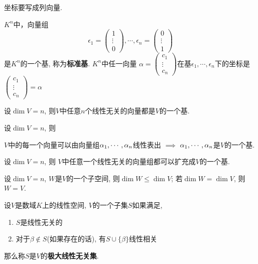 \begin{Remark}
坐标要写成列向量.
\end{Remark}

\begin{Example}
$K^n$中，向量组
$$
\epsilon_1 = \begin{pmatrix} 1 \\ \vdots \\ 0 \end{pmatrix},
\cdots,
\epsilon_n = \begin{pmatrix} 0 \\ \vdots \\ 1 \end{pmatrix}
$$
是$K^n$的一个基, 称为\textbf{标准基}.
 $K^n$中任一向量 $\displaystyle \alpha = \begin{pmatrix} c_1 \\ \vdots \\ c_n \end{pmatrix} $在基$\epsilon_1, \cdots, \epsilon_n$下的坐标是
$
\begin{pmatrix} c_1 \\ \vdots \\ c_n
\end{pmatrix} = \alpha
$
\end{Example}

\begin{Proposition}[!!]
设$\dim V = n$, 则$V$中任意$n$个线性无关的向量都是$V$的一个基.
\end{Proposition}

\begin{Proposition}[!]
设$\dim V = n$, 则
\begin{tightcenter}
$V$中的每一个向量可以由向量组$\alpha_{1}, \cdots, \alpha_{n}$线性表出 $\implies$ $\alpha_{1}, \cdots, \alpha_{n}$是$V$的一个基.
\end{tightcenter}
\end{Proposition}

\begin{Proposition}
设$\dim V = n$, 则
$V$中任意一个线性无关的向量组都可以扩充成$V$的一个基.
\end{Proposition}

\begin{Proposition}[!!]
设$\dim V = n$, $W$是$V$的一个子空间, 则$\dim W \le \dim V$; 若$\dim W = \dim V$, 则$W = V$.
\end{Proposition}

\begin{Definition}[极大线性无关集]
设$V$是数域$K$上的线性空间, $V$的一个子集$S$如果满足,
\begin{enumerate}[(1)]
\item $S$是线性无关的
\item 对于$\beta \notin S$(如果存在的话), 有$S \cup \{ \beta \}$线性相关
\end{enumerate}
那么称$S$是$V$的\textbf{极大线性无关集}.
\end{Definition}

